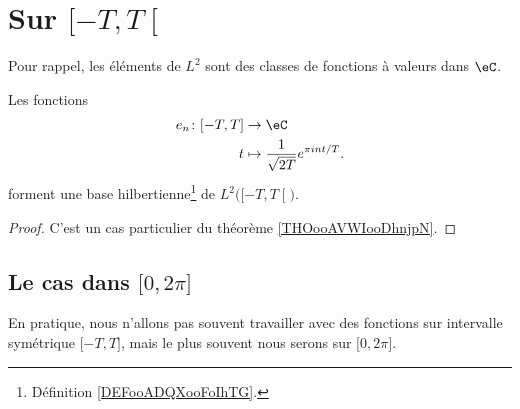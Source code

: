 
\section{Sur \( \mathopen[ -T , T \mathclose[\)}

Pour rappel, les éléments de \( L^2\) sont des classes de fonctions à valeurs dans \( \eC\).

\begin{proposition}     \label{PROPooHNJZooGfRCfU}
    Les fonctions
    \begin{equation}
        \begin{aligned}
            e_n\colon \mathopen[ -T , T \mathclose] & \to \eC                                        \\
            t                                       & \mapsto \frac{1}{ \sqrt{ 2T } } e^{\pi int/T}.
        \end{aligned}
    \end{equation}
    forment une base hilbertienne\footnote{Définition \ref{DEFooADQXooFoIhTG}.} de \( L^2\big( \mathopen[ -T , T \mathclose[ \big)\).
\end{proposition}

\begin{proof}
    C'est un cas particulier du théorème \ref{THOooAVWIooDhnjpN}.
\end{proof}

\subsection{Le cas dans \( \mathopen[ 0 , 2\pi \mathclose]\)}

En pratique, nous n'allons pas souvent travailler avec des fonctions sur intervalle symétrique \( \mathopen[ -T , T \mathclose]\), mais le plus souvent nous serons sur \( \mathopen[ 0 , 2\pi \mathclose]\).

